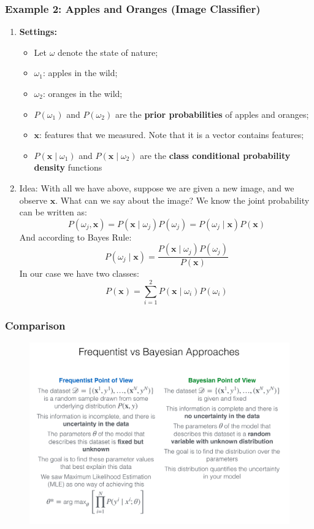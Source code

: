 \documentclass{article}
\begin{document}
\subsubsection{Example 2: Apples and Oranges (Image Classifier)}
\begin{enumerate}
    \item \textbf{Settings:}
        \begin{itemize}
            \item Let $\omega$ denote the state of nature;
            \item $\omega_1$: apples in the wild;
            \item $\omega_2$: oranges in the wild;
            \item $P(\omega_1)$ and $P(\omega_2)$ are the \textbf{prior probabilities} of apples and oranges;
            \item $\bm{x}$: features that we measured. Note that it is a vector contains features;
            \item $P(\bm{x} \mid \omega_1)$ and $P(\bm{x} \mid \omega_2)$ are the \textbf{class conditional probability density} functions
        \end{itemize}
    \item Idea: With all we have above, suppose we are given a new image, and we observe $\bm{x}$. What can we say about the image? We know the joint probability can be written as:
    \[ P(\omega_j, \bm{x}) = P(\bm{x} \mid \omega_j)P(\omega_j)=P(\omega_j \mid \bm{x})P(\bm{x})\]
    And according to Bayes Rule:
    \[ P(\omega_j \mid \bm{x}) = \frac{P(\bm{x} \mid \omega_j)P(\omega_j)}{P(\bm{x})} \]
    In our case we have two classes:
    \[ P(\bm{x}) = \sum_{i=1}^{2}P(\bm{x} \mid \omega_i)P(\omega_i) \]
\end{enumerate}

\subsubsection{Comparison}
\begin{figure}[h]
\centering
\includegraphics[width=16cm]{6.1.5_Comparison.png}
\end{figure}
\end{document}
